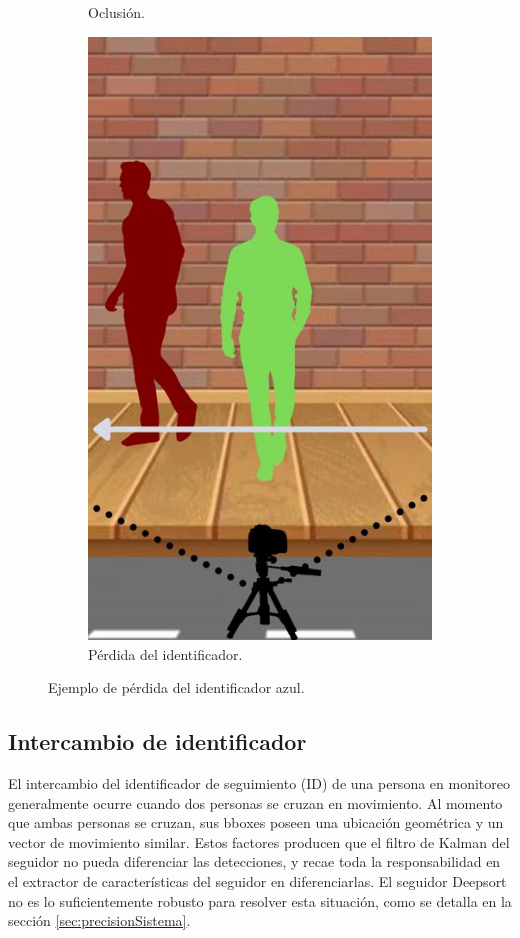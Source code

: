 \begin{figure}[!htpb]
\begin{subfigure}[b]{0.3\textwidth}
         \caption{Oclusión.}
         \label{fig:id_lost2de3}
     \end{subfigure}
     \hfill
     \begin{subfigure}[b]{0.3\textwidth}
         \centering
         \includegraphics[width=.65\textwidth]{./Figures/id_lost3.jpg}
         \caption{Pérdida del identificador.}
         \label{fig:id_lost3de3}
     \end{subfigure}
        \caption{Ejemplo de pérdida del identificador azul.}
        \label{fig:id_lost}
\end{figure}

\newpage

\subsection{Intercambio de identificador}

El intercambio del identificador de seguimiento (ID) de una persona en monitoreo generalmente ocurre cuando dos personas se cruzan en movimiento. Al momento que ambas personas se cruzan, sus bboxes poseen una ubicación geométrica y un vector de movimiento similar. Estos factores producen que el filtro de Kalman del seguidor no pueda diferenciar las detecciones, y recae toda la responsabilidad en el extractor de características del seguidor en diferenciarlas. El seguidor Deepsort no es lo suficientemente robusto para resolver esta situación, como se detalla en la sección \ref{sec:precisionSistema}.

